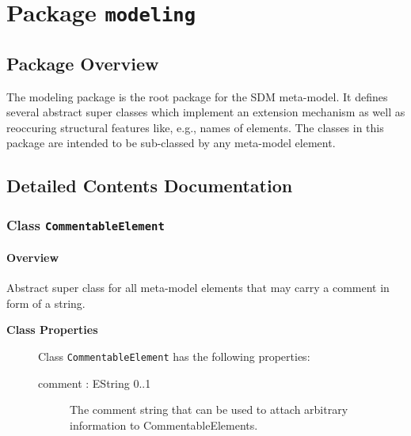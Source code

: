 

\section{Package \bfseries \texttt{modeling}\normalfont}
\subsection{Package Overview}
	
			
The modeling package is the root package for the SDM meta-model. It defines several abstract super classes which implement an extension mechanism as well as reoccuring structural features like, e.g., names of elements. The classes in this package are intended to be sub-classed by any meta-model element.	
		
	
			
		



\subsection{Detailed Contents Documentation}
\subsubsection{\Large{Class \bfseries \texttt{CommentableElement}\normalfont}}
\label{cls:modeling::CommentableElement} 
\paragraph{Overview}

	
			
Abstract super class for all meta-model elements that may carry a comment in form of a string.	
		
	


\begin{description}

	\item[\textbf{Class Properties}] Class \texttt{CommentableElement} has the following properties:
	\begin{description}
\item[comment : EString 			0..1]

\hspace{\fill}
\nopagebreak


	
			
The comment string that can be used to attach arbitrary information to CommentableElements.	
		
	
	\end{description}
	
	

\end{description}

